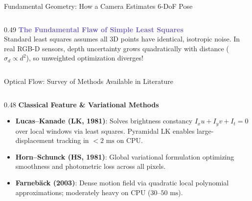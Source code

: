 \documentclass[aspectratio=169, 10pt]{beamer}
\begin{document}
\begin{frame}{Fundamental Geometry: How a Camera Estimates 6-DoF Pose}
\begin{columns}[T]
\begin{column}{0.49\textwidth}
      \vspace{0.1cm}
      {\small \textbf{\textcolor{SlateBlue}{The Fundamental Flaw of Simple Least Squares}}}\\
      \scriptsize
      Standard least squares assumes all 3D points have identical, isotropic noise. In real RGB-D sensors, depth uncertainty grows quadratically with distance ($\sigma_d \propto d^2$), so unweighted optimization diverges!
    \end{column}
  \end{columns}
\end{frame}

\begin{frame}{Optical Flow: Survey of Methods Available in Literature}
  \begin{columns}[T]
    \begin{column}{0.48\textwidth}
      {\small \textbf{\textcolor{NavyBlue}{Classical Feature \& Variational Methods}}}
      \vspace{0.1cm}
      \scriptsize
      \begin{itemize}
        \setlength{\itemsep}{3pt}
        \item \textbf{Lucas--Kanade (LK, 1981)}: Solves brightness constancy $I_x u + I_y v + I_t = 0$ over local windows via least squares. Pyramidal LK enables large-displacement tracking in $<2\text{ ms}$ on CPU.
        \item \textbf{Horn--Schunck (HS, 1981)}: Global variational formulation optimizing smoothness and photometric loss across all pixels.
        \item \textbf{Farneb\"ack (2003)}: Dense motion field via quadratic local polynomial approximations; moderately heavy on CPU ($30\text{--}50\text{ ms}$).
      \end{itemize}
    \end{column}


\end{columns}
\end{frame}
\end{document}
